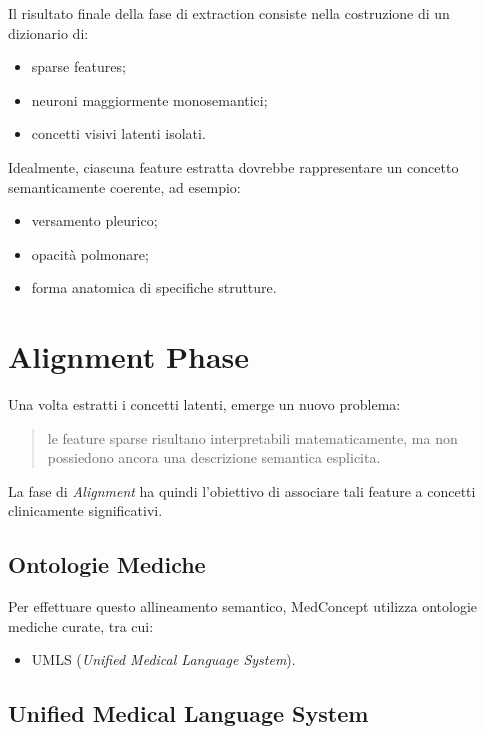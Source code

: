 Il risultato finale della fase di extraction consiste nella costruzione di un dizionario di:

\begin{itemize}
    \item sparse features;
    \item neuroni maggiormente monosemantici;
    \item concetti visivi latenti isolati.
\end{itemize}

Idealmente, ciascuna feature estratta dovrebbe rappresentare un concetto semanticamente coerente, ad esempio:

\begin{itemize}
    \item versamento pleurico;
    \item opacità polmonare;
    \item forma anatomica di specifiche strutture.
\end{itemize}

\section{Alignment Phase}

Una volta estratti i concetti latenti, emerge un nuovo problema:

\begin{quote}
le feature sparse risultano interpretabili matematicamente, ma non possiedono ancora una descrizione semantica esplicita.
\end{quote}

La fase di \textit{Alignment} ha quindi l'obiettivo di associare tali feature a concetti clinicamente significativi.

\subsection{Ontologie Mediche}

Per effettuare questo allineamento semantico, MedConcept utilizza ontologie mediche curate, tra cui:

\begin{itemize}
    \item UMLS (\textit{Unified Medical Language System}).
\end{itemize}

\subsection{Unified Medical Language System}

